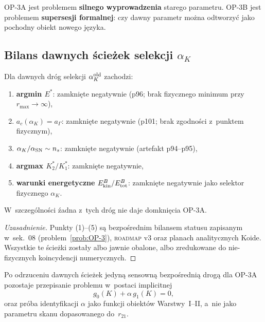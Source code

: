 \begin{remark}[Interpretacja]
OP-3A jest problemem \textbf{silnego wyprowadzenia}
starego parametru.
OP-3B jest problemem \textbf{supersesji formalnej}:
czy dawny parametr mo\.zna odtworzy\'c jako pochodny
obiekt nowego j\k{e}zyka.
\end{remark}

\subsection{Bilans dawnych \'scie\.zek selekcji $\alpha_K$}
\label{app:Z-old-paths}

\begin{proposition}
\label{prop:Z-old-paths-closed}
Dla dawnych dr\'og selekcji $\alpha_K^{\rm old}$ zachodzi:
\begin{enumerate}[nosep]
  \item \textbf{argmin $E^*$}: zamkni\k{e}te negatywnie
    (p96; brak fizycznego minimum przy $r_{\max}\to\infty$),
  \item \textbf{$a_c(\alpha_K)=a_\Gamma$}: zamkni\k{e}te negatywnie
    (p101; brak zgodno\'sci z~punktem fizycznym),
  \item \textbf{$\alpha_K/\alpha_{\rm SN}\sim n_s$}:
    zamkni\k{e}te negatywnie (artefakt p94--p95),
  \item \textbf{argmax $K_2^*/K_1^*$}: zamkni\k{e}te negatywnie,
  \item \textbf{warunki energetyczne}
    $E_{\rm kin}^B/E_{\rm tot}^B$:
    zamkni\k{e}te negatywnie jako selektor fizycznego $\alpha_K$.
\end{enumerate}
W~szczeg\'olno\'sci \'zadna z~tych dr\'og nie daje
domkni\k{e}cia OP-3A.
\end{proposition}

\begin{proof}[Uzasadnienie]
Punkty (1)--(5) s\k{a} bezpo\'srednim bilansem statusu zapisanym
w~sek.~08 (problem~\ref{prob:OP-3}),
\textsc{roadmap} v3 oraz planach analitycznych Koide.
Wszystkie te \'scie\.zki zosta\l{}y albo jawnie obalone,
albo zredukowane do nie-fizycznych koincydencji numerycznych.
\end{proof}

\begin{corollary}
\label{cor:Z-only-direct-path}
Po odrzuceniu dawnych \'scie\.zek jedyn\k{a} sensown\k{a}
bezpo\'sredni\k{a} drog\k{a} dla OP-3A pozostaje
przepisanie problemu w~postaci implicitnej
\begin{equation}
  g_0(K) + \alpha\,g_1(K) = 0,
\end{equation}
oraz pr\'oba identyfikacji $\alpha$ jako funkcji obiekt\'ow
Warstwy~I--II, a~nie jako parametru skanu dopasowanego do~$r_{21}$.
\end{corollary}

